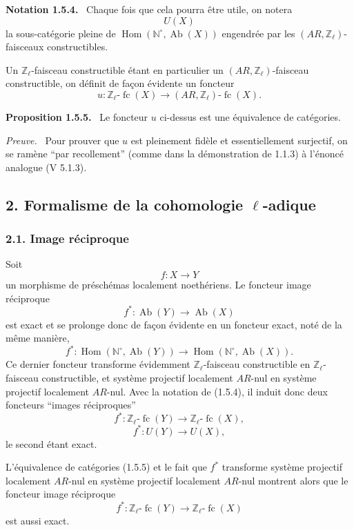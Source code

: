 \documentclass[11pt]{article}
\newenvironment{statement}[1]{\par\medskip\noindent\textbf{#1.}\ }{\par\medskip}
\newenvironment{prooftext}[1][Proof]{\par\noindent\emph{#1.}\ }{\par\medskip}
\DeclareMathOperator{\Hom}{Hom}
\providecommand{\Hom}{\operatorname{Hom}}
\providecommand{\Ab}{\operatorname{Ab}}
\providecommand{\fc}{\operatorname{fc}}
\providecommand{\Ab}{\operatorname{Ab}}
\providecommand{\Hom}{\operatorname{Hom}}
\begin{document}
\begin{statement}{Notation 1.5.4}
Chaque fois que cela pourra être utile, on notera
\[
U(X)
\]
la sous-catégorie pleine de \(\Hom(\mathbb N^\circ,\Ab(X))\) engendrée par les \((AR,\mathbb Z_\ell)\)-faisceaux constructibles.
\end{statement}

Un \(\mathbb Z_\ell\)-faisceau constructible étant en particulier un \((AR,\mathbb Z_\ell)\)-faisceau constructible, on définit de façon évidente un foncteur
\[
u:\mathbb Z_\ell\text{-}\fc(X)\longrightarrow (AR,\mathbb Z_\ell)\text{-}\fc(X).
\]

\begin{statement}{Proposition 1.5.5}
Le foncteur \(u\) ci-dessus est une équivalence de catégories.
\end{statement}

\begin{prooftext}[Preuve]
Pour prouver que \(u\) est pleinement fidèle et essentiellement surjectif, on se ramène ``par recollement'' (comme dans la démonstration de 1.1.3) à l'énoncé analogue (V 5.1.3).
\end{prooftext}

\subsection*{2. Formalisme de la cohomologie \(\ell\)-adique}

\subsubsection*{2.1. Image réciproque}

Soit
\[
f:X\longrightarrow Y
\]
un morphisme de préschémas localement noethériens. Le foncteur image réciproque
\[
f^*:\Ab(Y)\longrightarrow \Ab(X)
\]
est exact et se prolonge donc de façon évidente en un foncteur exact, noté de la même manière,
\[
f^*:\Hom(\mathbb N^\circ,\Ab(Y))\longrightarrow \Hom(\mathbb N^\circ,\Ab(X)).
\]
Ce dernier foncteur transforme évidemment \(\mathbb Z_\ell\)-faisceau constructible en \(\mathbb Z_\ell\)-faisceau constructible, et système projectif localement \(AR\)-nul en système projectif localement \(AR\)-nul. Avec la notation de (1.5.4), il induit donc deux foncteurs ``images réciproques''
\[
f^*:\mathbb Z_\ell\text{-}\fc(Y)\longrightarrow \mathbb Z_\ell\text{-}\fc(X),
\]
\[
f^*:U(Y)\longrightarrow U(X),
\]
le second étant exact.

L'équivalence de catégories (1.5.5) et le fait que \(f^*\) transforme système projectif localement \(AR\)-nul en système projectif localement \(AR\)-nul montrent alors que le foncteur image réciproque
\[
f^*:\mathbb Z_\ell\text{-}\fc(Y)\longrightarrow \mathbb Z_\ell\text{-}\fc(X)
\]
est aussi exact.
\end{document}
